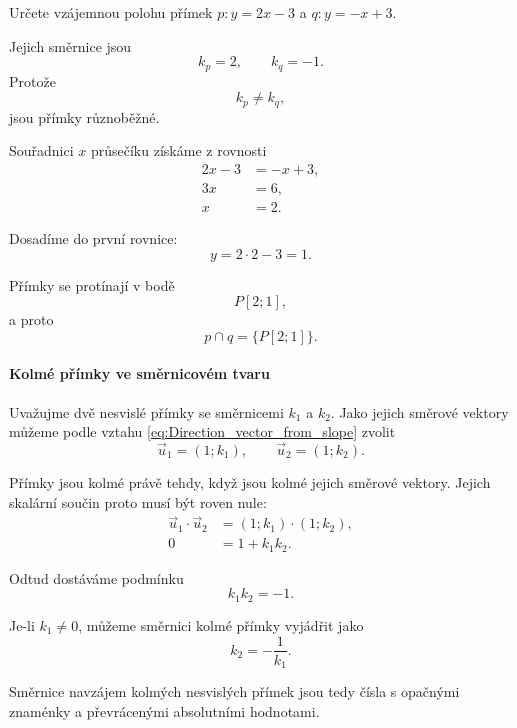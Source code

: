 \begin{example}\label{exa:Relative_position_slope_intercept_lines}
    Určete vzájemnou polohu přímek $p:y=2x-3$ a $q:y=-x+3$.

    Jejich směrnice jsou
    \[
        k_p=2,
        \qquad
        k_q=-1.
    \]
    Protože
    \[
        k_p\neq k_q,
    \]
    jsou přímky různoběžné.

    Souřadnici $x$ průsečíku získáme z rovnosti
    \begin{align*}
        2x-3&=-x+3,\\
        3x&=6,\\
        x&=2.
    \end{align*}

    Dosadíme do první rovnice:
    \[
        y=2\cdot2-3=1.
    \]

    Přímky se protínají v bodě
    \[
        P[2;1],
    \]
    a proto
    \[
        p\cap q=\{P[2;1]\}.
    \]
\end{example}

\paragraph{Kolmé přímky ve směrnicovém tvaru}
\label{subsubsec:Perpendicular_slope_intercept_lines}

Uvažujme dvě nesvislé přímky se směrnicemi $k_1$ a $k_2$. Jako jejich
směrové vektory můžeme podle vztahu
\eqref{eq:Direction_vector_from_slope} zvolit
\[
    \vec{u}_1=(1;k_1),
    \qquad
    \vec{u}_2=(1;k_2).
\]

Přímky jsou kolmé právě tehdy, když jsou kolmé jejich směrové vektory.
Jejich skalární součin proto musí být roven nule:
\begin{align*}
    \vec{u}_1\cdot\vec{u}_2
    &=
    (1;k_1)\cdot(1;k_2),\\
    0
    &=
    1+k_1k_2.
\end{align*}

Odtud dostáváme podmínku
\begin{equation}\label{eq:Perpendicular_slopes}
    k_1k_2=-1.
\end{equation}

Je-li $k_1\neq0$, můžeme směrnici kolmé přímky vyjádřit jako
\begin{equation}\label{eq:Perpendicular_slope}
    k_2=-\frac{1}{k_1}.
\end{equation}

Směrnice navzájem kolmých nesvislých přímek jsou tedy čísla
s opačnými znaménky a převrácenými absolutními hodnotami.

